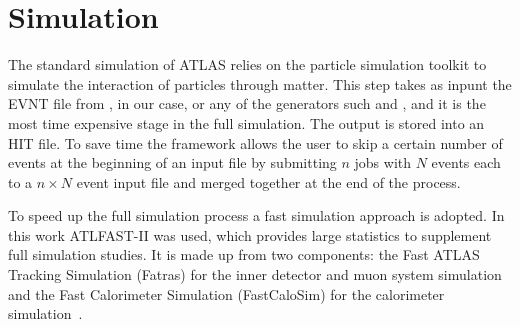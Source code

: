 \section{Simulation}
The standard simulation of ATLAS relies on the \geant particle simulation toolkit to simulate the interaction of particles through matter. This step takes as inpunt the EVNT file from \PYTHIA, in our case, or any of the generators such \HERWIG and \SHERPA, and it is the most time expensive stage in the full simulation. The output is stored into an HIT file. To save time the framework allows the user to skip a certain number of events at the beginning of an input file by submitting $n$ jobs with $N$ events each to a $n\times N$ event input file and merged together at the end of the process.



To speed up the full simulation process a fast simulation approach is adopted. In this work ATLFAST-II was used, which provides large statistics to supplement full simulation studies. It is made up from two components: the Fast ATLAS Tracking Simulation (Fatras) for the inner detector and muon system simulation and the Fast Calorimeter Simulation (FastCaloSim) for the calorimeter simulation~\cite{simulation}. 

